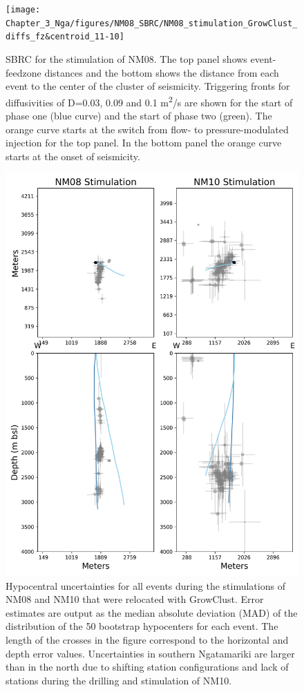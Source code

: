 \begin{figure}[h!]
\begin{center}
\texttt{[image: Chapter\_3\_Nga/figures/NM08\_SBRC/NM08\_stimulation\_GrowClust\_diffs\_fz\&centroid\_11-10]}
\caption[Diffusion r-t plots from NM08 stimulation]{{SBRC for the stimulation of NM08. The top panel shows event-\gls{feedzone}
distances and the bottom shows the distance from each event to the
center of the cluster of seismicity. Triggering fronts for diffusivities
of D=0.03, 0.09 and 0.1 m\textsuperscript{2}/s are shown for the start
of phase one (blue curve) and the start of phase two (green). The orange
curve starts at the switch from flow- to pressure-modulated injection
for the top panel. In the bottom panel the orange curve starts at the
onset of seismicity.
{\label{380648}}%
}}
\end{center}
\end{figure}

\begin{figure}[h!]
\begin{center}
\includegraphics[width=0.70\columnwidth]{Chapter_3_Nga/figures/Stimulation_loc_uncertainties/Nga_stims_location_uncertainties_original}
\caption[Location uncertainties for NM08 stimulation]{{Hypocentral uncertainties for all events during the stimulations of NM08
and NM10 that were relocated with GrowClust. Error estimates are output
as the median absolute deviation (MAD) of the distribution of the 50
bootstrap hypocenters for each event. The length of the crosses in the
figure correspond to the horizontal and depth error values.
Uncertainties in southern Ngatamariki are larger than in the north due
to shifting station configurations and lack of stations during the
drilling and \gls{stimulation} of NM10.
{\label{661304}}%
}}
\end{center}
\end{figure}


